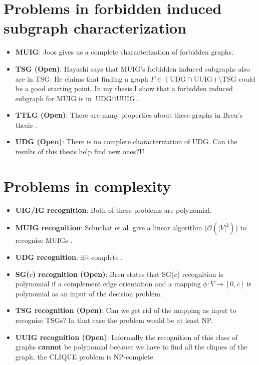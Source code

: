 \begin{appendices}

\chapter{Problems in forbidden induced subgraph characterization}
  \begin{itemize}
    \item \textbf{MUIG}: Joos \cite{joosCharacterizationMixedUnit2013} gives us a complete characterization of forbidden graphs.
    \item \textbf{TSG (Open)}: Hayashi \cite{hayashiThinStripGraphs2017} says that MUIG's forbidden induced subgraphs also are in TSG. He claims that finding a graph $F \in (\text{UDG}\cap\text{UUIG}) \setminus \text{TSG}$ could be a good starting point. In my thesis I show that a forbidden induced subgraph for MUIG is in $\text{UDG}\cap\text{UUIG}$.
    \item \textbf{TTLG (Open)}: There are many properties about these graphs in Breu's thesis \cite{breuAlgorithmicAspectsConstrained1996}.
    \item \textbf{UDG (Open)}: There is no complete characterization of UDG. Can the results of this thesis help find new ones?U
  \end{itemize}

  \chapter{Problems in complexity}
    \begin{itemize}
      \item \textbf{UIG/IG recognition}: Both of these problems are polynomial.
      \item \textbf{MUIG recognition}: Schuchat et al. give a linear algorithm ($\mathcal{O}(|V|^2)$) to recognise MUIGs \cite{shuchatUnitMixedInterval2014}.
      \item \textbf{UDG recognition}: $\exists\mathbb{R}$-complete \cite{ExistentialTheoryReals2006}.
      \item \textbf{SG($c$) recognition (Open)}: Breu  \cite{breuAlgorithmicAspectsConstrained1996} states that SG($c$) recognition is polynomial if a complement edge orientation and a mapping $\phi : V \to [0,c]$ is polynomial as an input of the decision problem.
      \item \textbf{TSG recognition (Open)}: Can we get rid of the mapping as input to recognise TSGs? In that case the problem would be at least NP.
      \item \textbf{UUIG recognition (Open)}: Informally the recognition of this class of graphs \textbf{cannot} be polynomial because we have to find all the cliques of the graph; the CLIQUE problem is NP-complete.
    \end{itemize}

\end{appendices}
